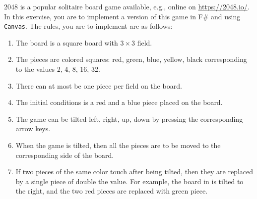 2048 is a popular solitaire board game available, e.g., online on \url{https://2048.io/}. In this exercise, you are to implement a version of this game in F\# and using \lstinline{Canvas}. The rules, you are to implement are as follows:
\begin{enumerate}
\item The board is a square board with $3\times 3$ field.
\item The pieces are colored squares: red, green, blue, yellow, black corresponding to the values 2, 4, 8, 16, 32.
\item There can at most be one piece per field on the board.
\item The initial conditions is a red and a blue piece placed on the board.
\item The game can be tilted left, right, up, down by pressing the corresponding arrow keys.
\item When the game is tilted, then all the pieces are to be moved to the corresponding side of the board.
\item If two pieces of the same color touch after being tilted, then they are replaced by a single piece of double the value. For example, the board in  is tilted to the right, and the two red pieces are replaced with green piece.
  \begin{figure}
    \centering

\end{figure}
\end{enumerate}
